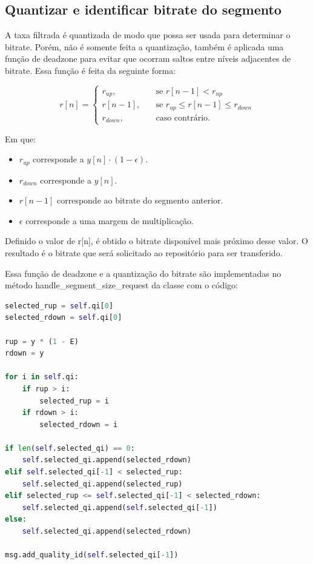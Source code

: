 \documentclass[10pt,twocolumn,letterpaper]{article}
\begin{document}
	\subsection{Quantizar e identificar bitrate do segmento}
	
	A taxa filtrada é quantizada de modo que possa ser usada para determinar o bitrate. Porém, não é somente feita a quantização, também é aplicada uma função de deadzone para evitar que ocorram saltos entre níveis adjacentes de bitrate. Essa função é feita da seguinte forma:
	
	\begin{equation}
		r[n] = 
		\begin{cases}
			r_{up},       & \quad \text{se } r[n-1] < r_{up}\\
			r[n-1],       & \quad \text{se } r_{up} \leq r[n-1] \leq r_{down} \\
			r_{down},       & \quad \text{caso contrário.}
		\end{cases}
	\end{equation}
	
	Em que:
	\begin{itemize}
		\item $r_{up}$ corresponde a $y[n] \cdot (1 - \epsilon)$.
		\item $r_{down}$ corresponde a $y[n]$.
		\item $r[n-1]$ corresponde ao bitrate do segmento anterior.
		\item $\epsilon$ corresponde a uma margem de multiplicação.
	\end{itemize}
	
	Definido o valor de r[n], é obtido o bitrate disponível mais próximo desse valor. O resultado é o bitrate que será solicitado ao repositório para ser transferido.
	
	Essa função de deadzone e a quantização do bitrate são implementadas no método handle\_segment\_size\_request da classe com o código:
	
	\begin{lstlisting}[language=python]
selected_rup = self.qi[0]
selected_rdown = self.qi[0]

rup = y * (1 - E)
rdown = y

for i in self.qi:
	if rup > i:
		selected_rup = i
	if rdown > i:
		selected_rdown = i

if len(self.selected_qi) == 0:
	self.selected_qi.append(selected_rdown)
elif self.selected_qi[-1] < selected_rup:
	self.selected_qi.append(selected_rup)
elif selected_rup <= self.selected_qi[-1] < selected_rdown:
	self.selected_qi.append(self.selected_qi[-1])
else:
	self.selected_qi.append(selected_rdown)

msg.add_quality_id(self.selected_qi[-1])
	\end{lstlisting}
	
\end{document}
